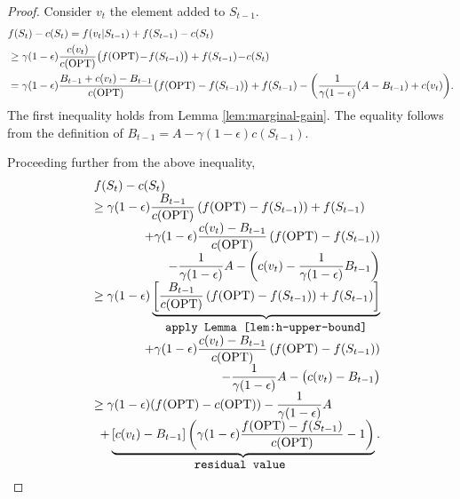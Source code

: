\documentclass[10pt]{article} %
\theoremstyle{remark}
\newcommand{\OPT}{{\rm OPT}}
\begin{document}
\begin{proof}
Consider $v_t$ the element added to $S_{t-1}$.
\begin{align*}
    & f(S_t)-c(S_t) =f(v_t|S_{t-1})+f(S_{t-1})-{c(S_t)}\\
    &\geq \gamma(1-\epsilon) \displaystyle\frac{c(v_t)}{c(\OPT)} \big ( f(\OPT) \!-\! f(S_{t-1}) \big ) +f(S_{t-1})\!-\!c(S_t)\\
    &= { \gamma(1-\epsilon) \displaystyle\frac{B_{t-1}+c(v_t)-B_{t-1}}{c(\OPT)} \big ( f(\OPT) - f(S_{t-1}) \big )}  +f(S_{t-1})- {\left(\frac{1}{\gamma(1-\epsilon)}(A-B_{t-1})+c(v_t)\right)}. 
\end{align*}
The first inequality holds from Lemma \ref{lem:marginal-gain}. The equality follows from the definition of  $B_{t-1} = A-\gamma (1-\epsilon) c(S_{t-1})$.

Proceeding further from the above inequality, 
\[
\begin{array}{rl}
& f(S_t)-c(S_t) \\
                &\geq  {\gamma(1-\epsilon) \displaystyle\frac{B_{t-1}}{c(\OPT)} \left( f(\OPT) - f(S_{t-1})\right)}+ f(S_{t-1})  \\
                &\hfill  + {\gamma(1-\epsilon) \displaystyle\frac{c(v_t)-B_{t-1}}{c(\OPT)} \left( f(\OPT) - f(S_{t-1}) \right) }\\
                 
                & \hfill- \displaystyle\frac{1}{\gamma(1-\epsilon)}A-\left(c(v_t)-\frac{1}{\gamma(1-\epsilon)}B_{t-1}\right)\\
                 
                &\geq  \gamma(1-\epsilon)  \underbrace{\left[\displaystyle\frac{B_{t-1}}{c(\OPT)} \left( f(\OPT) - f(S_{t-1}) \right) + f(S_{t-1})\right]}_{\mbox{\tt apply Lemma~\ref{lem:h-upper-bound}}}   \\
                 
                &\hfill + \gamma(1-\epsilon) \displaystyle\frac{c(v_t)-B_{t-1}}{c(\OPT)} \left( f(\OPT) - f(S_{t-1}) \right) \\
                    &\hfill- {\displaystyle\frac{1}{\gamma(1-\epsilon)}A-\big(c(v_t)-B_{t-1}\big)}\\   
                &\geq \gamma(1-\epsilon) (f(\OPT)-c(\OPT)) - \displaystyle\frac{1}{\gamma(1-\epsilon)}A \\
                &\hfill + \underbrace{\left[c(v_t)-B_{t-1}\right]\left( \gamma(1-\epsilon) \displaystyle\frac{f(\OPT) - f(S_{t-1})}{c(\OPT)} -1 \right)}_{\mbox{\tt residual value }}. 
\end{array}
\]


\end{proof}
\end{document}

